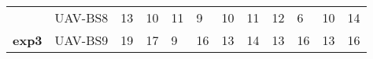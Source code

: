\begin{table}[]
\begin{tabular}{|ll|l|l|l|l|l|l|l|l|l|l|}
\multicolumn{1}{|l|}{}                                                        & UAV-BS8 & 13          & 10          & 11          & 9           & 10          & 11          & 12          & 6           & 10          & 14            \\ \cline{2-12} 
\multicolumn{1}{|l|}{\multirow{-10}{*}{\textbf{exp3}}}                        & UAV-BS9 & 19          & 17          & 9           & 16          & 13          & 14          & 13          & 16          & 13          & 16            \\ \hline
\end{tabular}
\label{tab:connecteduser}
\end{table}